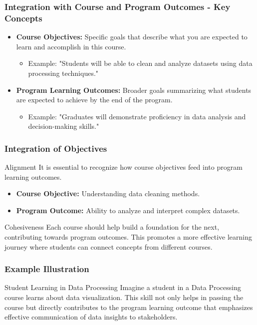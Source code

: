 \documentclass[aspectratio=169]{beamer}
\begin{document}
\begin{frame}[fragile]
    \frametitle{Integration with Course and Program Outcomes - Key Concepts}
    \begin{itemize}
        \item \textbf{Course Objectives:} Specific goals that describe what you are expected to learn and accomplish in this course.
        \begin{itemize}
            \item Example: "Students will be able to clean and analyze datasets using data processing techniques."
        \end{itemize}
        
        \item \textbf{Program Learning Outcomes:} Broader goals summarizing what students are expected to achieve by the end of the program.
        \begin{itemize}
            \item Example: "Graduates will demonstrate proficiency in data analysis and decision-making skills."
        \end{itemize}
    \end{itemize}
\end{frame}

\begin{frame}[fragile]
    \frametitle{Integration of Objectives}
    \begin{block}{Alignment}
        It is essential to recognize how course objectives feed into program learning outcomes.
        \begin{itemize}
            \item \textbf{Course Objective:} Understanding data cleaning methods.
            \item \textbf{Program Outcome:} Ability to analyze and interpret complex datasets.
        \end{itemize}
    \end{block}
    
    \begin{block}{Cohesiveness}
        Each course should help build a foundation for the next, contributing towards program outcomes. This promotes a more effective learning journey where students can connect concepts from different courses.
    \end{block}
\end{frame}

\begin{frame}[fragile]
    \frametitle{Example Illustration}
    \begin{block}{Student Learning in Data Processing}
        Imagine a student in a Data Processing course learns about data visualization. This skill not only helps in passing the course but directly contributes to the program learning outcome that emphasizes effective communication of data insights to stakeholders.
    \end{block}
\end{frame}
\end{document}
